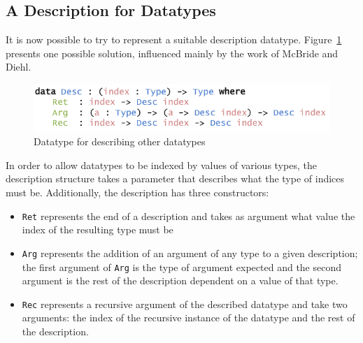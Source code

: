 \documentclass{ituthesis}
\begin{document}
\subsection{A Description for Datatypes}
\label{sub:ADescriptionforDatatypes}
It is now possible to try to represent a suitable description datatype. Figure~\ref{fig:descriptiondatatype} presents one possible solution, influenced mainly by the work of McBride and Diehl.

\begin{figure}[ht]
\begin{center}
    \includegraphics[scale=0.5]{Figures/ADescriptionforDatatypes.png}
\end{center}
\caption{Datatype for describing other datatypes}
\label{fig:descriptiondatatype}
\end{figure}

In order to allow datatypes to be indexed by values of various types, the description structure takes a parameter that describes what the type of indices must be.
Additionally, the description has three constructors:
\begin{itemize}
  \item  \texttt{Ret} represents the end of a description and takes as argument what value the index of the resulting type must be
  \item  \texttt{Arg} represents the addition of an argument of any type to a given description; the first argument of \texttt{Arg} is the type of argument expected and the second argument is the rest of the description dependent on a value of that type.
  \item  \texttt{Rec} represents a recursive argument of the described datatype and take two arguments: the index of the recursive instance of the datatype and the rest of the description.
\end{itemize}
\end{document}
